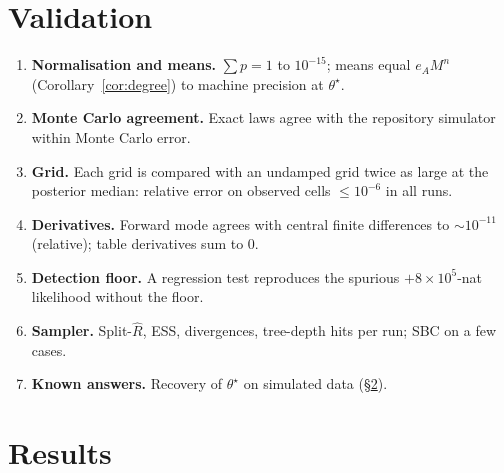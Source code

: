 \documentclass[11pt]{article}
\theoremstyle{definition}
\theoremstyle{remark}
\begin{document}
\section{Validation}\label{sec:validation}
\begin{enumerate}
\item \textbf{Normalisation and means.} $\sum p=1$ to $10^{-15}$; means equal $e_AM^n$ (Corollary~\ref{cor:degree}) to machine precision at $\theta^\star$.
\item \textbf{Monte Carlo agreement.} Exact laws agree with the repository simulator within Monte Carlo error.
\item \textbf{Grid.} Each grid is compared with an undamped grid twice as large at the posterior median: relative error on observed cells $\le10^{-6}$ in all runs.
\item \textbf{Derivatives.} Forward mode agrees with central finite differences to $\sim10^{-11}$ (relative); table derivatives sum to 0.
\item \textbf{Detection floor.} A regression test reproduces the spurious $+8\times10^5$-nat likelihood without the floor.
\item \textbf{Sampler.} Split-$\hat R$, ESS, divergences, tree-depth hits per run; SBC on a few cases.
\item \textbf{Known answers.} Recovery of $\theta^\star$ on simulated data (\S\ref{sec:results}).
\end{enumerate}

\section{Results}\label{sec:results}
\end{document}

